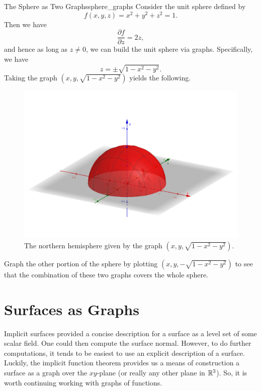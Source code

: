                  \begin{ex}{The Sphere as Two Graphs}{sphere_graphs}
                 	Consider the unit sphere defined by
                 	\[
                 	f(x,y,z) = x^2+y^2+z^2 = 1.
                 	\]
                 	Then we have
                 	\[
                 	\frac{\partial f}{\partial z} = 2z,
                 	\]
                 	and hence as long as $z\neq 0$, we can build the unit sphere via graphs.  Specifically, we have
                 	\[
                 	z = \pm \sqrt{1-x^2-y^2}.
                 	\]
                 	Taking the graph $(x,y,\sqrt{1-x^2-y^2})$ yields the following.
                 	\begin{figure}[H]
                 		\centering
                 		\includegraphics[width=.8\textwidth]{Figures_Part_6/hemisphere.png}
                 		\caption{The northern hemisphere given by the graph $(x,y,\sqrt{1-x^2-y^2})$.}
                 	\end{figure}
                 \end{ex}
                 
                 \begin{exercise}
                 	Graph the other portion of the sphere by plotting $(x,y,-\sqrt{1-x^2-y^2})$ to see that the combination of these two graphs covers the whole sphere.
                 \end{exercise}
                 
                 \section{Surfaces as Graphs}
                 
                 Implicit surfaces provided a concise description for a surface as a level set of some scalar field.  One could then compute the surface normal.   However, to do further computations, it tends to be easiest to use an explicit description of a surface.  Luckily, the implicit function theorem provides us a means of construction a surface as a graph over the $xy$-plane (or really any other plane in $\mathbb{R}^3$).  So, it is worth continuing working with graphs of functions.
                 
